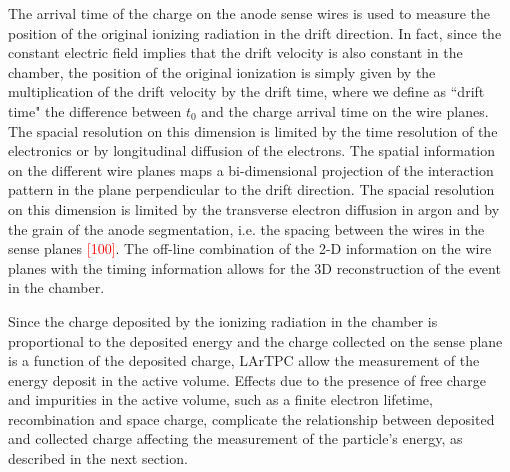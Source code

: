 The arrival time of the charge on the anode sense wires is used to measure the position of the original ionizing radiation in the drift direction. In fact, since the constant electric field implies that the drift velocity is also constant in the chamber, the position of the original ionization is simply given by the multiplication of the drift velocity by the drift time, where we define as ``drift time" the difference between $t_0$ and the charge arrival time on the wire planes. The spacial resolution on this dimension is limited by the time resolution of the electronics or by longitudinal diffusion of the electrons.
The spatial information on the different wire planes maps a bi-dimensional projection of the interaction pattern in the plane perpendicular to the drift direction. The spacial resolution on this dimension is limited by the transverse electron diffusion in argon and by the grain of the anode segmentation, i.e. the spacing between the wires in the sense planes \textcolor{red}{[100]}.  The off-line combination of the 2-D information on the wire planes with the timing information allows for the 3D reconstruction of the event in the chamber.

Since the charge deposited by the ionizing radiation in the chamber is proportional to the deposited energy and the charge collected on the sense plane is a function of the deposited charge, LArTPC allow the measurement of the energy deposit in the active volume. Effects due to the presence of free charge and impurities in the active volume, such as a finite electron lifetime, recombination and space charge, complicate the relationship between deposited and collected charge affecting the measurement of the particle's energy, as described in the next section.
 
